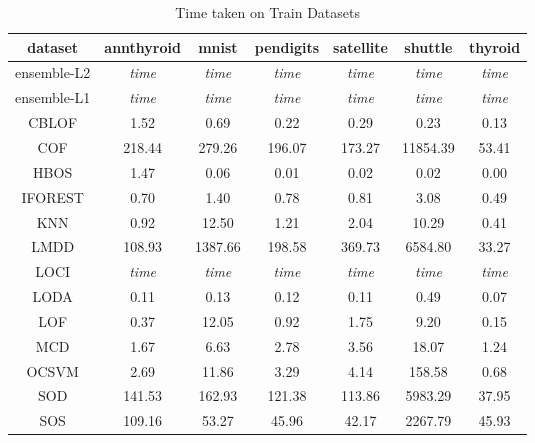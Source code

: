 \begin{table*}[!t]
\renewcommand{\arraystretch}{1.25}
\caption{Time taken on Train Datasets}
\label{table:results:train-time}
\centering
\begin{tabular}{|c|c|c|c|c|c|c|}
    \hline
    \textbf{dataset} & \textbf{annthyroid} & \textbf{mnist} & \textbf{pendigits} & \textbf{satellite} & \textbf{shuttle} & \textbf{thyroid} \\
    \hline
    ensemble-L2 & \textit{time} & \textit{time} & \textit{time} & \textit{time} & \textit{time} & \textit{time} \\
    \hline
    ensemble-L1 & \textit{time} & \textit{time} & \textit{time} & \textit{time} & \textit{time} & \textit{time} \\
    \hline
    CBLOF & 1.52 & 0.69 & 0.22 & 0.29 & 0.23 & 0.13 \\
    \hline
    COF & 218.44 & 279.26 & 196.07 & 173.27 & 11854.39 & 53.41 \\
    \hline
    HBOS & 1.47 & 0.06 & 0.01 & 0.02 & 0.02 & 0.00 \\
    \hline
    IFOREST & 0.70 & 1.40 & 0.78 & 0.81 & 3.08 & 0.49 \\
    \hline
    KNN & 0.92 & 12.50 & 1.21 & 2.04 & 10.29 & 0.41 \\
    \hline
    LMDD & 108.93 & 1387.66 & 198.58 & 369.73 & 6584.80 & 33.27 \\
    \hline
    LOCI & \textit{time} & \textit{time} & \textit{time} & \textit{time} & \textit{time} & \textit{time} \\
    \hline
    LODA & 0.11 & 0.13 & 0.12 & 0.11 & 0.49 & 0.07 \\
    \hline
    LOF & 0.37 & 12.05 & 0.92 & 1.75 & 9.20 & 0.15 \\
    \hline
    MCD & 1.67 & 6.63 & 2.78 & 3.56 & 18.07 & 1.24 \\
    \hline
    OCSVM & 2.69 & 11.86 & 3.29 & 4.14 & 158.58 & 0.68 \\
    \hline
    SOD & 141.53 & 162.93 & 121.38 & 113.86 & 5983.29 & 37.95 \\
    \hline
    SOS & 109.16 & 53.27 & 45.96 & 42.17 & 2267.79 & 45.93 \\
    \hline
    \end{tabular}
\end{table*}


